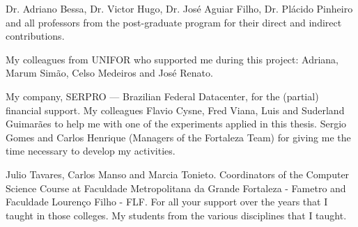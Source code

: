 Dr. Adriano Bessa, Dr. Victor Hugo, Dr. José Aguiar Filho,  Dr. Plácido Pinheiro and all professors from the post-graduate program for their direct and indirect contributions.

My colleagues from UNIFOR who supported me during this project: Adriana, Marum Simão, Celso Medeiros and José Renato. 

My company, SERPRO — Brazilian Federal Datacenter, for the (partial) financial support. My colleagues Flavio Cysne, Fred Viana, Luis and Suderland Guimarães to help me with one of the experiments applied in this thesis. Sergio Gomes and Carlos Henrique (Managers of the Fortaleza Team) for giving me the time necessary to develop my activities.

Julio Tavares, Carlos Manso and Marcia Tonieto. Coordinators of the Computer Science Course at
Faculdade Metropolitana da Grande Fortaleza - Fametro and Faculdade Lourenço Filho - FLF. For all your support over the years that I taught in those colleges. My students from the various disciplines that I taught.

